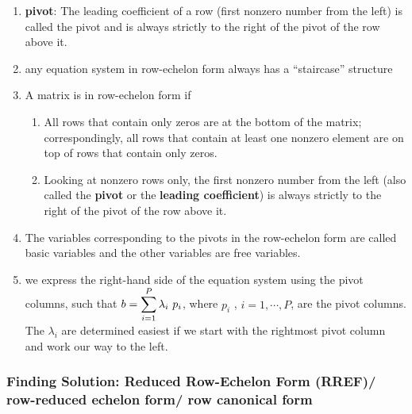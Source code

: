 \begin{enumerate}[itemsep=0.2cm]
    \item \textbf{pivot}: The leading coefficient of a row (first nonzero number from the left) is called the pivot and is always strictly to the right of the pivot of the row above it.
    \hfill \cite{mfml/book/mml/Deisenroth-Faisal-Ong}

    \item any equation system in row-echelon form always has a “staircase” structure
    \hfill \cite{mfml/book/mml/Deisenroth-Faisal-Ong}

    \item A matrix is in row-echelon form if
    \begin{enumerate}
        \item All rows that contain only zeros are at the bottom of the matrix; correspondingly, all rows that contain at least one nonzero element are on top of rows that contain only zeros.
        \hfill \cite{mfml/book/mml/Deisenroth-Faisal-Ong}

        \item Looking at nonzero rows only, the first nonzero number from the left (also called the \textbf{pivot} or the \textbf{leading coefficient}) is always strictly to the right of the pivot of the row above it.
        \hfill \cite{mfml/book/mml/Deisenroth-Faisal-Ong}
    \end{enumerate}

    \item The variables corresponding to the pivots in the row-echelon form are called basic variables and the other variables are free variables.
    \hfill \cite{mfml/book/mml/Deisenroth-Faisal-Ong}

    \item we express the right-hand side of the equation system using the pivot columns, such that $b = \displaystyle\sum^P_{i=1} \lambda_i\ p_i$, where $p_i$ , $i = 1, \cdots , P$, are the pivot columns. 
    \\
    The $\lambda_i$ are determined easiest if we start with the rightmost pivot column and work our way to the left.
    \hfill \cite{mfml/book/mml/Deisenroth-Faisal-Ong}

    
\end{enumerate}








\subsubsection{Finding Solution: Reduced Row-Echelon Form (RREF)/ row-reduced echelon form/ row canonical form \cite{mfml/book/mml/Deisenroth-Faisal-Ong}}

